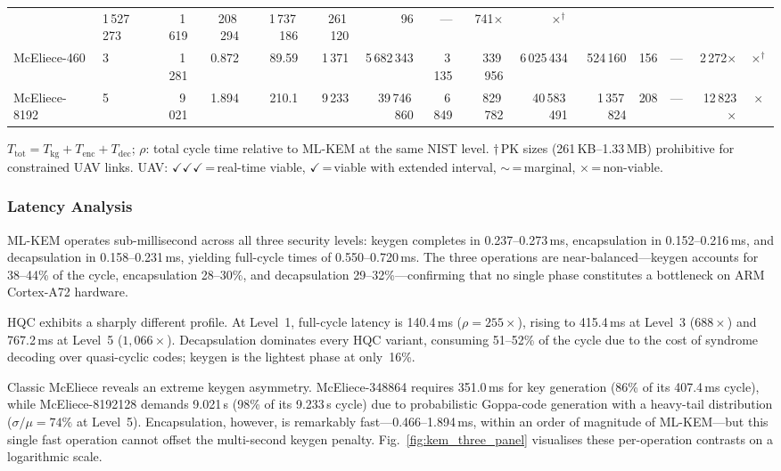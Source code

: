 \begin{table}[t]
\begin{tabular}{@{}ll rrr r rrr r rrr r c@{}}
  & 1\,527\,273 & 1\,619 & 208\,294 & 1\,737\,186
  & 261\,120 &    96 & ---
  & 741$\times$ & $\times^{\dagger}$ \\
McEliece-460 & 3 & 1\,281 & 0.872 & 89.59 & 1\,371
  & 5\,682\,343 & 3\,135 & 339\,956 & 6\,025\,434
  & 524\,160 &   156 & ---
  & 2\,272$\times$ & $\times^{\dagger}$ \\
McEliece-8192& 5 & 9\,021 & 1.894 & 210.1 & 9\,233
  & 39\,746\,860 & 6\,849 & 829\,782 & 40\,583\,491
  & 1\,357\,824 &   208 & ---
  & 12\,823$\times$ & $\times$ \\
\bottomrule
\end{tabular}
\begin{tablenotes}
\item $T_\text{tot}=T_\text{kg}+T_\text{enc}+T_\text{dec}$;\;
  $\rho$: total cycle time relative to ML-KEM at the same NIST level.\;
  $\dagger$\,PK sizes (261\,KB--1.33\,MB) prohibitive for constrained UAV links.\;
  UAV: $\checkmark\!\checkmark\!\checkmark$\,=\,real-time viable,
  $\checkmark$\,=\,viable with extended interval,
  $\sim$\,=\,marginal,
  $\times$\,=\,non-viable.
\end{tablenotes}
\end{table}

\subsubsection{Latency Analysis}

ML-KEM operates sub-millisecond across all three security levels:
keygen completes in 0.237--0.273\,ms, encapsulation in
0.152--0.216\,ms, and decapsulation in 0.158--0.231\,ms,
yielding full-cycle times of 0.550--0.720\,ms.
The three operations are near-balanced---keygen accounts for
38--44\% of the cycle, encapsulation 28--30\%, and decapsulation
29--32\%---confirming that no single phase constitutes a
bottleneck on ARM Cortex-A72 hardware.

HQC exhibits a sharply different profile.
At Level~1, full-cycle latency is 140.4\,ms ($\rho = 255\times$),
rising to 415.4\,ms at Level~3 ($688\times$) and 767.2\,ms
at Level~5 ($1{,}066\times$).
Decapsulation dominates every HQC variant, consuming
51--52\% of the cycle due to the cost of syndrome decoding
over quasi-cyclic codes; keygen is the lightest phase at only~16\%.

Classic McEliece reveals an extreme keygen asymmetry.
McEliece-348864 requires 351.0\,ms for key generation (86\% of
its 407.4\,ms cycle), while McEliece-8192128 demands 9.021\,s
(98\% of its 9.233\,s cycle) due to probabilistic Goppa-code
generation with a heavy-tail distribution
($\sigma/\mu = 74\%$ at Level~5).
Encapsulation, however, is remarkably fast---0.466--1.894\,ms,
within an order of magnitude of ML-KEM---but this single fast
operation cannot offset the multi-second keygen penalty.
Fig.~\ref{fig:kem_three_panel} visualises these per-operation
contrasts on a logarithmic scale.

